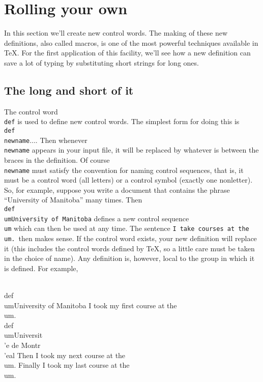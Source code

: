  
 
\section{Rolling your own} 
 
In this section we'll create new control words.  The making of 
these new definitions, also called macros, is one of the most 
powerful techniques available in \TeX\null.  For the first 
application of this facility, we'll see how a new definition can 
save a lot of typing by substituting short strings for long ones. 
 
\subsection{The long and short of it} 
 
The control word {\tt \\def} is used to define new control words. 
The simplest form for doing this is {\tt \\def\\newname\lb$\ldots$\rb}. 
Then whenever {\tt \\newname} appears in your 
input file, it will be replaced by whatever is between the braces 
in the definition.  Of course {\tt \\newname} must satisfy the 
convention for naming control sequences, that is, it must be a 
control word (all letters) or a control symbol (exactly one 
nonletter). So, for example, suppose you write a document that 
contains the phrase ``University of Manitoba'' many times.  Then 
{\tt \\def\\um\lb University of Manitoba\rb} defines a new 
control sequence {\tt \\um} which can then be used at any time. 
The sentence {\tt I take courses at the \\um.}\ then makes 
sense. If the control word exists, your new definition will 
replace it (this includes the control words defined by \TeX{}, so 
a little care must be taken in the choice of name). Any 
definition is, however,  local to the group in which it is 
defined.  For example,  
 
\beginuser 
\\def\\um\lb University of Manitoba\rb 
I took my first course at the \\um. 
\lb 
\\def\\um\lb Universit\\'e de Montr\\'eal\rb 
Then I took my next course at the \\um. 
\rb 
Finally I took my last course at the \\um. 
\enduser 
 
